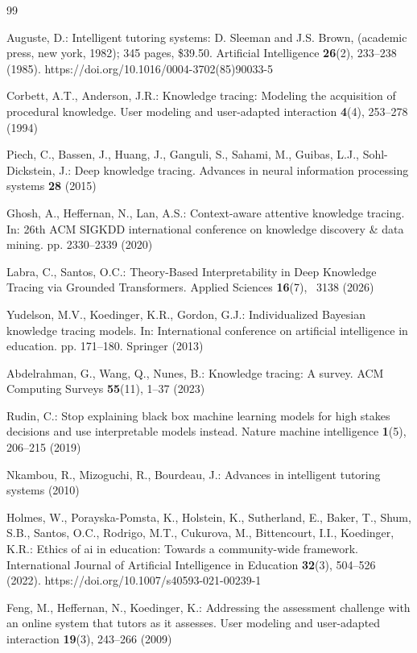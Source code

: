 \documentclass[runningheads]{llncs}
\begin{document}
\begin{thebibliography}{99}
\providecommand{\url}[1]{\texttt{#1}}
\providecommand{\urlprefix}{URL }
\providecommand{\doi}[1]{https://doi.org/#1}

Auguste, D.: Intelligent tutoring systems: {D}. {S}leeman and {J}.{S}. {B}rown,
  (academic press, new york, 1982); 345 pages, \$39.50. Artificial Intelligence
   \textbf{26}(2),  233--238 (1985). \doi{10.1016/0004-3702(85)90033-5}

Corbett, A.T., Anderson, J.R.: Knowledge tracing: Modeling the acquisition of
  procedural knowledge. User modeling and user-adapted interaction
  \textbf{4}(4),  253--278 (1994)

Piech, C., Bassen, J., Huang, J., Ganguli, S., Sahami, M., Guibas, L.J.,
  Sohl-Dickstein, J.: Deep knowledge tracing. Advances in neural information
  processing systems  \textbf{28} (2015)

Ghosh, A., Heffernan, N., Lan, A.S.: Context-aware attentive knowledge tracing.
  In: 26th ACM SIGKDD international conference on knowledge discovery \& data
  mining. pp. 2330--2339 (2020)

Labra, C., Santos, O.C.: {Theory-Based Interpretability in Deep Knowledge
  Tracing via Grounded Transformers}. Applied Sciences  \textbf{16}(7), ~3138
  (2026)

Yudelson, M.V., Koedinger, K.R., Gordon, G.J.: Individualized {Bayesian}
  knowledge tracing models. In: International conference on artificial
  intelligence in education. pp. 171--180. Springer (2013)

Abdelrahman, G., Wang, Q., Nunes, B.: Knowledge tracing: A survey. ACM
  Computing Surveys  \textbf{55}(11),  1--37 (2023)

Rudin, C.: Stop explaining black box machine learning models for high stakes
  decisions and use interpretable models instead. Nature machine intelligence
  \textbf{1}(5),  206--215 (2019)

Nkambou, R., Mizoguchi, R., Bourdeau, J.: Advances in intelligent tutoring
  systems (2010)

Holmes, W., Porayska-Pomsta, K., Holstein, K., Sutherland, E., Baker, T., Shum,
  S.B., Santos, O.C., Rodrigo, M.T., Cukurova, M., Bittencourt, I.I.,
  Koedinger, K.R.: Ethics of ai in education: Towards a community-wide
  framework. International Journal of Artificial Intelligence in Education
  \textbf{32}(3),  504--526 (2022). \doi{10.1007/s40593-021-00239-1}

Feng, M., Heffernan, N., Koedinger, K.: Addressing the assessment challenge
  with an online system that tutors as it assesses. User modeling and
  user-adapted interaction  \textbf{19}(3),  243--266 (2009)

\end{thebibliography}
\end{document}
